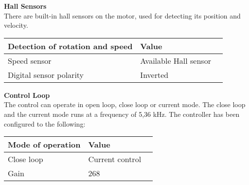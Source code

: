 \textbf{Hall Sensors}\\
There are built-in hall sensors on the motor, used for detecting its position and velocity. 
\begin{table}[H]
	\begin{tabular}{|l|l|p{4.3cm}|}
		\hline%
		\textbf{Detection of rotation and speed}       &  \textbf{Value}         \\
		\hline%
		Speed sensor                                & Available Hall sensor           \\
		\hline%
		Digital sensor polarity							  & Inverted              \\
		\hline%
	\end{tabular}
\end{table}

\textbf{Control Loop}\\
The control can operate in open loop, close loop or current mode. The close loop and the current mode runs at a frequency of 5,36 kHz. The controller has been configured to the following:
\begin{table}[H]
	\begin{tabular}{|l|l|p{4.3cm}|}
		\hline%
		\textbf{Mode of operation}       &  \textbf{Value}         \\
		\hline%
		Close loop                                & Current control           \\
		\hline%
		Gain							  & 268              \\
		\hline%
	\end{tabular}
\end{table}

